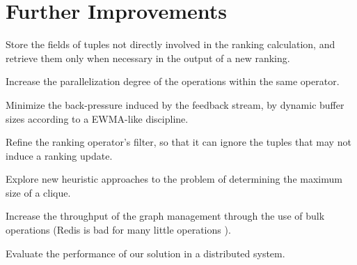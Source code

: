 \section{Further Improvements}
\label{sec:further-improvements}

Store the fields of tuples not directly involved in the ranking calculation, and retrieve them only when necessary in the output of a new ranking.

Increase the parallelization degree of the operations within the same operator.

Minimize the back-pressure induced by the feedback stream, by dynamic buffer sizes according to a EWMA-like discipline.

Refine the ranking operator's filter, so that it can ignore the tuples that may not induce a ranking update.

Explore new heuristic approaches to the problem of determining the maximum size of a clique.

Increase the throughput of the graph management through the use of bulk operations (Redis is bad for many little operations \cite{Zhang2014}).

Evaluate the performance of our solution in a distributed system.

